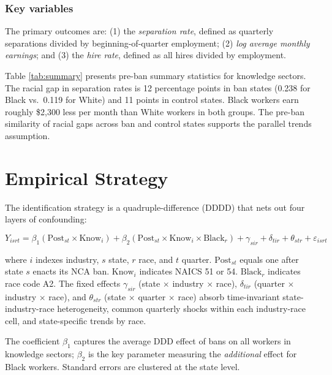 \documentclass[12pt]{article}
\begin{document}
\subsubsection*{Key variables} The primary outcomes are: (1) the \emph{separation rate}, defined as quarterly separations divided by beginning-of-quarter employment; (2) \emph{log average monthly earnings}; and (3) the \emph{hire rate}, defined as all hires divided by employment.



Table \ref{tab:summary} presents pre-ban summary statistics for knowledge sectors. The racial gap in separation rates is 12 percentage points in ban states (0.238 for Black vs.\ 0.119 for White) and 11 points in control states. Black workers earn roughly \$2,300 less per month than White workers in both groups. The pre-ban similarity of racial gaps across ban and control states supports the parallel trends assumption.

\section{Empirical Strategy}

The identification strategy is a quadruple-difference (DDDD) that nets out four layers of confounding:

\begin{equation}
Y_{isrt} = \beta_1(\text{Post}_{st} \times \text{Know}_i) + \beta_2(\text{Post}_{st} \times \text{Know}_i \times \text{Black}_r) + \gamma_{sir} + \delta_{tir} + \theta_{str} + \varepsilon_{isrt}
\label{eq:dddd}
\end{equation}

\noindent where $i$ indexes industry, $s$ state, $r$ race, and $t$ quarter. $\text{Post}_{st}$ equals one after state $s$ enacts its NCA ban. $\text{Know}_i$ indicates NAICS 51 or 54. $\text{Black}_r$ indicates race code A2. The fixed effects $\gamma_{sir}$ (state $\times$ industry $\times$ race), $\delta_{tir}$ (quarter $\times$ industry $\times$ race), and $\theta_{str}$ (state $\times$ quarter $\times$ race) absorb time-invariant state-industry-race heterogeneity, common quarterly shocks within each industry-race cell, and state-specific trends by race.

The coefficient $\beta_1$ captures the average DDD effect of bans on all workers in knowledge sectors; $\beta_2$ is the key parameter measuring the \emph{additional} effect for Black workers. Standard errors are clustered at the state level.
\end{document}
